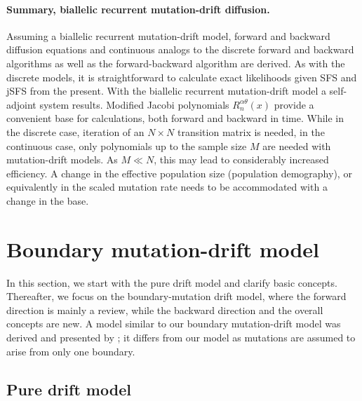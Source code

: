 \documentclass[preprint]{elsarticle}
\begin{document}
\paragraph{Summary, biallelic recurrent mutation-drift diffusion.} Assuming a biallelic recurrent mutation-drift model, forward and backward diffusion equations and continuous analogs to the discrete forward and backward algorithms as well as the forward-backward algorithm are derived. As with the discrete models, it is straightforward to calculate exact likelihoods given SFS and jSFS from the present. With the biallelic recurrent mutation-drift model a self-adjoint system results. Modified Jacobi polynomials $R_n^{\alpha\theta}(x)$ provide a convenient base for calculations, both forward and backward in time. While in the discrete case, iteration of an $N\times N$ transition matrix is needed, in the continuous case, only polynomials up to the sample size $M$ are needed with mutation-drift models. As $M\ll N$, this may lead to considerably increased efficiency. A change in the effective population size (population demography), or equivalently in the scaled mutation rate needs to be accommodated with a change in the base. 

\section{Boundary mutation-drift model}\label{section:boundary_mutation_drift_cont}

In this section, we start with the pure drift model and clarify basic concepts. Thereafter, we focus on the boundary-mutation drift model, where the forward direction is mainly a review, while the backward direction and the overall concepts are new. A model similar to our boundary mutation-drift model was derived and presented by \citet{Evan07}; it differs from our model as mutations are assumed to arise from only one boundary.

\subsection{Pure drift model}\label{section:pure_drift}
\end{document}
